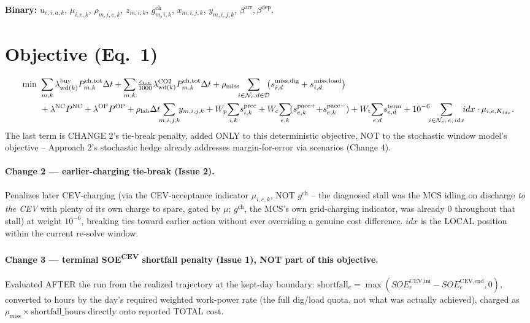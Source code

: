 \documentclass[11pt]{article}
\newcommand{\dt}{\Delta t}
\begin{document}
\smallskip
\textbf{Binary:} $u_{e,i,a,k}$, $\mu_{i,e,k}$, $\rho_{m,i,e,k}$, $z_{m,i,k}$,
$g^{\text{ch}}_{m,i,k}$, $x_{m,i,j,k}$, $y_{m,i,j,k}$, $\beta^{\text{arr}},\beta^{\text{dep}}$.

\section{Objective (Eq.\ 1)}
\begin{align}
\min\ &\sum_{m,k}\lambda^{\text{buy}}_{\mathrm{wd}(k)}P^{\text{ch,tot}}_{m,k}\dt
      +\sum_{m,k}\tfrac{c_{\text{ton}}}{1000}\lambda^{\text{CO2}}_{\mathrm{wd}(k)}P^{\text{ch,tot}}_{m,k}\dt
      +\rho_{\text{miss}}\!\!\sum_{i\in\mathcal{N}_c,d\in\mathcal{D}}\!\!\bigl(s^{\text{miss,dig}}_{i,d}+s^{\text{miss,load}}_{i,d}\bigr)\notag\\
     &+\lambda^{\text{NC}}P^{\text{NC}}+\lambda^{\text{OP}}P^{\text{OP}}
      +\rho_{\text{lab}}\dt\!\!\sum_{m,i,j,k}\!\! y_{m,i,j,k}
      + W_{\text{p}}\!\sum_{i,k}\! s^{\text{prec}}_{i,k}
      + W_{\text{c}}\!\sum_{e,k}\!(s^{\text{pace}+}_{e,k}{+}s^{\text{pace}-}_{e,k})
      + W_{\text{t}}\!\sum_{e,d}\! s^{\text{term}}_{e,d}
      +10^{-6}\!\!\sum_{i\in\mathcal{N}_c,\,e,\,idx}\!\! idx\cdot \mu_{i,e,K_{idx}}.
\end{align}
The last term is CHANGE 2's tie-break penalty, added ONLY to this deterministic objective, NOT to
the stochastic window model's objective -- Approach 2's stochastic hedge already addresses
margin-for-error via scenarios (Change 4).

\paragraph{Change 2 --- earlier-charging tie-break (Issue 2).} Penalizes later CEV-charging (via
the CEV-acceptance indicator $\mu_{i,e,k}$, NOT $g^{\text{ch}}$ -- the diagnosed stall was the MCS
idling on discharge \emph{to the CEV} with plenty of its own charge to spare, gated by $\mu$;
$g^{\text{ch}}$, the MCS's own grid-charging indicator, was already 0 throughout that stall) at
weight $10^{-6}$, breaking ties toward earlier action without ever overriding a genuine cost
difference. $idx$ is the LOCAL position within the current re-solve window.

\paragraph{Change 3 --- terminal SOE\textsuperscript{CEV} shortfall penalty (Issue 1), NOT part of
this objective.} Evaluated AFTER the run from the realized trajectory at the kept-day boundary:
$\text{shortfall}_e=\max(SOE^{\text{CEV,ini}}_e-SOE^{\text{CEV,end}}_e,0)$, converted to hours by
the day's required weighted work-power rate (the full dig/load quota, not what was actually
achieved), charged as
$\rho_{\text{miss}}\times\text{shortfall\_hours}$ directly onto reported TOTAL cost.
\end{document}
